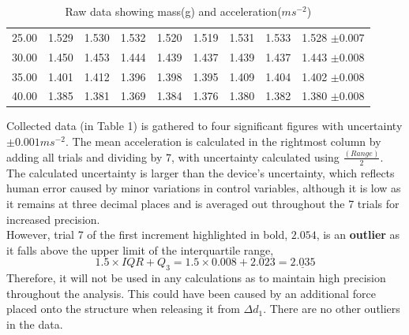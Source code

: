 \documentclass[11pt]{article}
\begin{document}
\begin{table}[H]
\begin{tabular}{ccccccccc}
25.00                                                    & 1.529                & 1.530                 & 1.532                & 1.520                 & 1.519               & 1.531               & 1.533               & 1.528 $\pm0.007$                                                                \\
\rowcolor[HTML]{EFEFEF}
30.00                                                    & 1.450                & 1.453                 & 1.444                & 1.439                & 1.437               & 1.439               & 1.437               & 1.443 $\pm0.008$                                                                \\
35.00                                                    & 1.401                & 1.412                & 1.396                & 1.398                & 1.395               & 1.409               & 1.404               & 1.402 $\pm0.008$                                                                \\
\rowcolor[HTML]{EFEFEF}
40.00                                                    & 1.385                & 1.381                & 1.369                & 1.384                & 1.376               & 1.380                & 1.382               & 1.380 $\pm0.008$
\end{tabular}
\caption{\label{tbl:1}Raw data showing mass(g) and acceleration($ms^{-2}$)}
\end{table}



Collected data (in Table 1) is gathered to four significant figures with uncertainty $\pm0.001ms^{-2}$. The mean acceleration is calculated in the rightmost column by adding all trials and dividing by 7, with uncertainty calculated using $\frac{(Range)}{2}$. The calculated uncertainty is larger than the device's uncertainty, which reflects human error caused by minor variations in control variables, although it is low as it remains at three decimal places and is averaged out throughout the 7 trials for increased precision.
\\


However, trial 7 of the first increment highlighted in bold, $2.054$, is an \textbf{outlier} as it falls above the upper limit of the interquartile range, $$1.5\times IQR+Q_3=1.5\times0.008+2.023=\underline{2.035}$$ Therefore, it will not be used in any calculations as to maintain high precision throughout the analysis. This could have been caused by an additional force placed onto the structure when releasing it from $\Delta d_1$. There are no other outliers in the data.
\\
\end{document}
